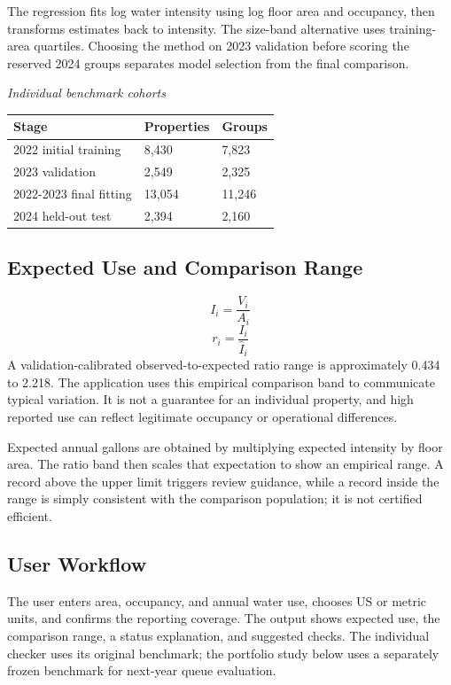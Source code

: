 \documentclass[12pt,a4paper]{article}
\begin{document}
The regression fits log water intensity using log floor area and occupancy, then transforms estimates back to intensity. The size-band alternative uses training-area quartiles. Choosing the method on 2023 validation before scoring the reserved 2024 groups separates model selection from the final comparison.

\begin{center}\small
\textit{Individual benchmark cohorts}\par\medskip
\begin{tabularx}{\textwidth}{XXX}
\toprule
\textbf{Stage} & \textbf{Properties} & \textbf{Groups}\\\midrule
2022 initial training & 8,430 & 7,823\\
2023 validation & 2,549 & 2,325\\
2022-2023 final fitting & 13,054 & 11,246\\
2024 held-out test & 2,394 & 2,160\\
\bottomrule\end{tabularx}\end{center}
\subsection{Expected Use and Comparison Range}
\[I_i=\frac{V_i}{A_i}\]
\[r_i=\frac{I_i}{\hat I_i}\]
A validation-calibrated observed-to-expected ratio range is approximately 0.434 to 2.218. The application uses this empirical comparison band to communicate typical variation. It is not a guarantee for an individual property, and high reported use can reflect legitimate occupancy or operational differences.

Expected annual gallons are obtained by multiplying expected intensity by floor area. The ratio band then scales that expectation to show an empirical range. A record above the upper limit triggers review guidance, while a record inside the range is simply consistent with the comparison population; it is not certified efficient.

\subsection{User Workflow}
The user enters area, occupancy, and annual water use, chooses US or metric units, and confirms the reporting coverage. The output shows expected use, the comparison range, a status explanation, and suggested checks. The individual checker uses its original benchmark; the portfolio study below uses a separately frozen benchmark for next-year queue evaluation.
\end{document}
